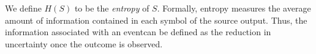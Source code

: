 \documentclass{subfiles}
\begin{document}
    We define \(H(S)\) to be the \emph{entropy} of \(S\). 
    Formally, entropy measures the average amount of information contained 
        in each symbol of the source output.
        Thus, the information associated with an event\footnotemark can be defined
        as the reduction in uncertainty once the outcome is observed.

\end{document}
